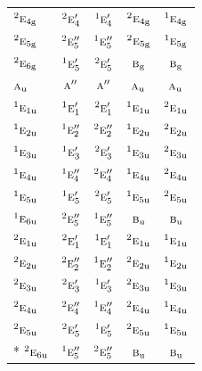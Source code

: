 \documentclass[10pt,a4paper]{article}
\numberwithin{equation}{section}
\newcommand{\irr}[1]{\text{\normalfont\scshape #1}}
\newcommand{\conjpair}[1]{{}^{#1}}
\newcommand{\ptag}[1]{\mathrm{#1}}
\begin{document}
{\begin{longtable}{@{}lcccc@{}}
$\conjpair{2}\irr{e}_{4\ptag{g}}$ & $\conjpair{2}\irr{e}_{4}'$ & $\conjpair{1}\irr{e}_{4}'$ & $\conjpair{2}\irr{e}_{4\ptag{g}}$ & $\conjpair{1}\irr{e}_{4\ptag{g}}$\\
$\conjpair{2}\irr{e}_{5\ptag{g}}$ & $\conjpair{2}\irr{e}_{5}''$ & $\conjpair{1}\irr{e}_{5}''$ & $\conjpair{2}\irr{e}_{5\ptag{g}}$ & $\conjpair{1}\irr{e}_{5\ptag{g}}$\\
$\conjpair{2}\irr{e}_{6\ptag{g}}$ & $\conjpair{1}\irr{e}_{5}'$ & $\conjpair{2}\irr{e}_{5}'$ & $\irr{b}_{\ptag{g}}$ & $\irr{b}_{\ptag{g}}$\\
$\irr{a}_{\ptag{u}}$ & $\irr{a}''$ & $\irr{a}''$ & $\irr{a}_{\ptag{u}}$ & $\irr{a}_{\ptag{u}}$\\
$\conjpair{1}\irr{e}_{1\ptag{u}}$ & $\conjpair{1}\irr{e}_{1}'$ & $\conjpair{2}\irr{e}_{1}'$ & $\conjpair{1}\irr{e}_{1\ptag{u}}$ & $\conjpair{2}\irr{e}_{1\ptag{u}}$\\
$\conjpair{1}\irr{e}_{2\ptag{u}}$ & $\conjpair{1}\irr{e}_{2}''$ & $\conjpair{2}\irr{e}_{2}''$ & $\conjpair{1}\irr{e}_{2\ptag{u}}$ & $\conjpair{2}\irr{e}_{2\ptag{u}}$\\
$\conjpair{1}\irr{e}_{3\ptag{u}}$ & $\conjpair{1}\irr{e}_{3}'$ & $\conjpair{2}\irr{e}_{3}'$ & $\conjpair{1}\irr{e}_{3\ptag{u}}$ & $\conjpair{2}\irr{e}_{3\ptag{u}}$\\
$\conjpair{1}\irr{e}_{4\ptag{u}}$ & $\conjpair{1}\irr{e}_{4}''$ & $\conjpair{2}\irr{e}_{4}''$ & $\conjpair{1}\irr{e}_{4\ptag{u}}$ & $\conjpair{2}\irr{e}_{4\ptag{u}}$\\
$\conjpair{1}\irr{e}_{5\ptag{u}}$ & $\conjpair{1}\irr{e}_{5}'$ & $\conjpair{2}\irr{e}_{5}'$ & $\conjpair{1}\irr{e}_{5\ptag{u}}$ & $\conjpair{2}\irr{e}_{5\ptag{u}}$\\
$\conjpair{1}\irr{e}_{6\ptag{u}}$ & $\conjpair{2}\irr{e}_{5}''$ & $\conjpair{1}\irr{e}_{5}''$ & $\irr{b}_{\ptag{u}}$ & $\irr{b}_{\ptag{u}}$\\
$\conjpair{2}\irr{e}_{1\ptag{u}}$ & $\conjpair{2}\irr{e}_{1}'$ & $\conjpair{1}\irr{e}_{1}'$ & $\conjpair{2}\irr{e}_{1\ptag{u}}$ & $\conjpair{1}\irr{e}_{1\ptag{u}}$\\
$\conjpair{2}\irr{e}_{2\ptag{u}}$ & $\conjpair{2}\irr{e}_{2}''$ & $\conjpair{1}\irr{e}_{2}''$ & $\conjpair{2}\irr{e}_{2\ptag{u}}$ & $\conjpair{1}\irr{e}_{2\ptag{u}}$\\
$\conjpair{2}\irr{e}_{3\ptag{u}}$ & $\conjpair{2}\irr{e}_{3}'$ & $\conjpair{1}\irr{e}_{3}'$ & $\conjpair{2}\irr{e}_{3\ptag{u}}$ & $\conjpair{1}\irr{e}_{3\ptag{u}}$\\
$\conjpair{2}\irr{e}_{4\ptag{u}}$ & $\conjpair{2}\irr{e}_{4}''$ & $\conjpair{1}\irr{e}_{4}''$ & $\conjpair{2}\irr{e}_{4\ptag{u}}$ & $\conjpair{1}\irr{e}_{4\ptag{u}}$\\
$\conjpair{2}\irr{e}_{5\ptag{u}}$ & $\conjpair{2}\irr{e}_{5}'$ & $\conjpair{1}\irr{e}_{5}'$ & $\conjpair{2}\irr{e}_{5\ptag{u}}$ & $\conjpair{1}\irr{e}_{5\ptag{u}}$\\*
$\conjpair{2}\irr{e}_{6\ptag{u}}$ & $\conjpair{1}\irr{e}_{5}''$ & $\conjpair{2}\irr{e}_{5}''$ & $\irr{b}_{\ptag{u}}$ & $\irr{b}_{\ptag{u}}$\\
\bottomrule\end{longtable}}
\end{document}
